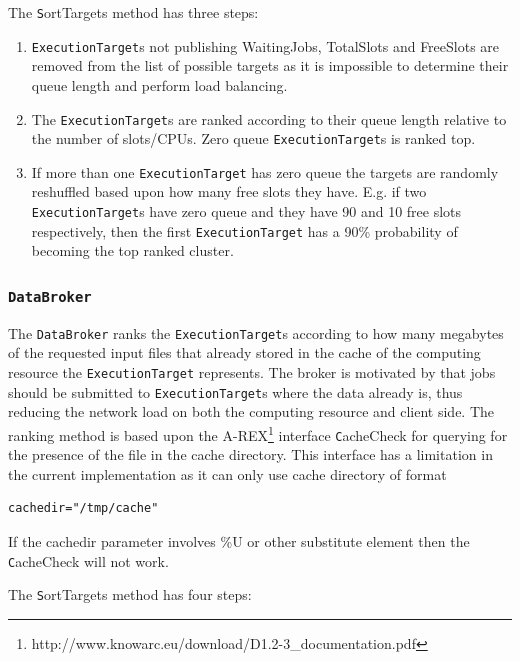 \documentclass{book}
\newcommand{\DataBroker}{\texttt{DataBroker}}
\newcommand{\ExecutionTarget}{\texttt{ExecutionTarget}}
\begin{document}
The {\texttt SortTargets} method has three steps:

\begin{enumerate}
\item{{\ExecutionTarget}s not publishing WaitingJobs, TotalSlots and FreeSlots are removed from the list of possible targets 
as it is impossible to determine their queue length and perform load balancing.}
\item{The {\ExecutionTarget}s are ranked according to their queue length relative to the number of slots/CPUs. Zero queue 
{\ExecutionTarget}s is ranked top.}
\item{If more than one {\ExecutionTarget} has zero queue the targets are randomly reshuffled based upon how many free slots 
they have. E.g. if two {\ExecutionTarget}s have zero queue and they have 90 and 10 free slots respectively, then the first
{\ExecutionTarget} has a 90\% probability of becoming the top ranked cluster.}
\end{enumerate}

\subsubsection{\DataBroker}

The {\DataBroker} ranks the {\ExecutionTarget}s according to how many megabytes of the requested input files that already 
stored in the cache of the computing resource the {\ExecutionTarget} represents. The broker is motivated by that jobs should 
be submitted to {\ExecutionTarget}s where the data already is, thus reducing the network load on both the computing resource 
and client side. The ranking method is based upon the A-REX\footnote{http://www.knowarc.eu/download/D1.2-3\_documentation.pdf} 
interface {\texttt CacheCheck} for querying for the presence of the file in the cache directory. This interface has a limitation 
in the current implementation as it can only use cache directory of format

\begin{shaded}
\begin{verbatim}
cachedir="/tmp/cache"
\end{verbatim}
\end{shaded}

If the cachedir parameter involves {\%}U or other substitute element then the {\texttt CacheCheck} will not work.

The {\texttt SortTargets} method has four steps:
\end{document}
